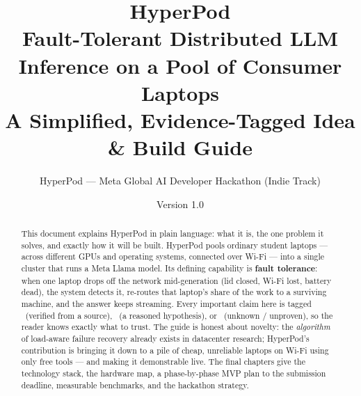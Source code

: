 \documentclass[11pt]{article}
\title{\vspace{-1.5em}\textbf{HyperPod}\\[0.2em]
\large Fault-Tolerant Distributed LLM Inference on a Pool of Consumer Laptops\\[0.3em]
\normalsize A Simplified, Evidence-Tagged Idea \& Build Guide}
\author{\normalsize HyperPod --- Meta Global AI Developer Hackathon (Indie Track)}
\date{\normalsize Version 1.0}
\begin{document}
\maketitle
\thispagestyle{fancy}

\begin{abstract}
\noindent This document explains HyperPod in plain language: what it is, the one
problem it solves, and exactly how it will be built. HyperPod pools ordinary
student laptops --- across different GPUs and operating systems, connected over
Wi-Fi --- into a single cluster that runs a Meta Llama model. Its defining
capability is \textbf{fault tolerance}: when one laptop drops off the network
mid-generation (lid closed, Wi-Fi lost, battery dead), the system detects it,
re-routes that laptop's share of the work to a surviving machine, and the answer
keeps streaming. Every important claim here is tagged \VER\ (verified from a
source), \HYP\ (a reasoned hypothesis), or \UNK\ (unknown / unproven), so the
reader knows exactly what to trust. The guide is honest about novelty: the
\emph{algorithm} of load-aware failure recovery already exists in datacenter
research; HyperPod's contribution is bringing it down to a pile of cheap,
unreliable laptops on Wi-Fi using only free tools --- and making it demonstrable
live. The final chapters give the technology stack, the hardware map, a
phase-by-phase MVP plan to the submission deadline, measurable benchmarks, and
the hackathon strategy.
\end{abstract}

\tableofcontents
\clearpage














\end{document}
